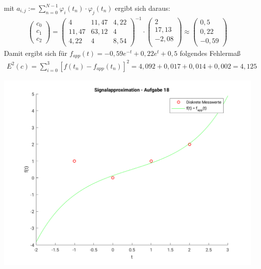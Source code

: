 	mit $a_{i,j}:= \sum_{n=0}^{N-1}\varphi_i(t_n)\cdot \varphi_j(t_n)$ ergibt sich daraus:
	\begin{align*}
		\left(\begin{matrix}c_0\\c_1\\c_2\end{matrix}\right) = 
		\left(\begin{matrix}
			4		&	11,47	& 4,22\\
			11,47	&	63,12	& 4\\
			4,22	&	4		& 8,54
		\end{matrix}\right)^{-1} \cdot
		\left(\begin{matrix}
			2\\
			17,13\\
			-2,08\\
		\end{matrix}\right) \approx 
		\left(\begin{matrix}
			0,5\\
			0,22\\
			-0,59
		\end{matrix}\right)
	\end{align*}
	Damit ergibt sich für $f_{app}(t) = -0,59 e^{-t}+0,22 e^{t}+0,5$ folgendes Fehlermaß
	\begin{align*}
		E^2(c) = \sum_{i=0}^3 \left[ f(t_n) - f_{app}(t_n)\right]^2 = 4,092 + 0,017 + 0,014 + 0,002 = 4,125
	\end{align*}
	
	\includegraphics[scale = 0.8]{A18_functionPlot.png}
